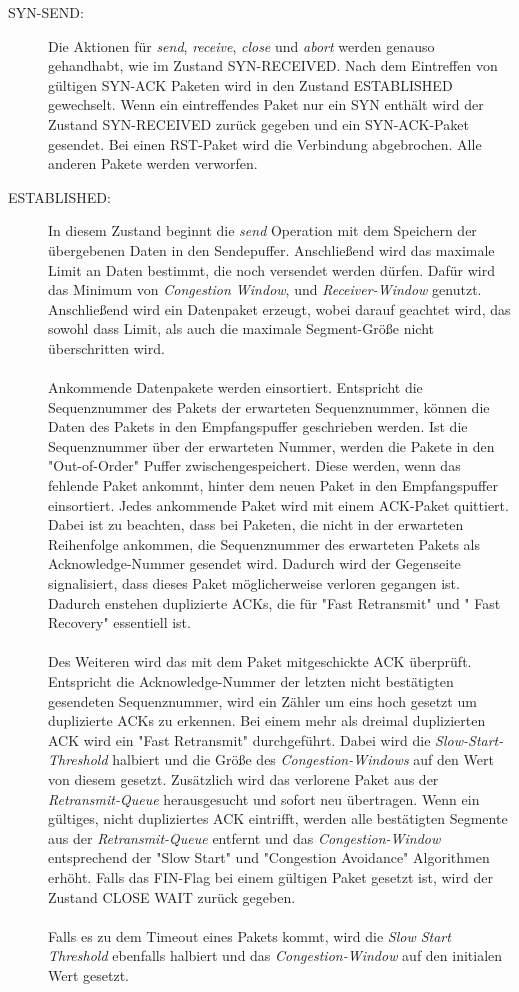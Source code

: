 \begin{description}
	
\item[SYN-SEND:]
Die Aktionen für \textit{send}, \textit{receive},\textit{ close} und \textit{abort} werden genauso gehandhabt, wie im Zustand SYN-RECEIVED.
Nach dem Eintreffen von gültigen SYN-ACK Paketen wird in den Zustand ESTABLISHED gewechselt. Wenn ein eintreffendes Paket nur ein SYN enthält wird der Zustand SYN-RECEIVED zurück gegeben und ein SYN-ACK-Paket gesendet. Bei einen RST-Paket wird die Verbindung abgebrochen. Alle anderen Pakete werden verworfen.   
	
\item[ESTABLISHED:]

In diesem Zustand beginnt die \textit{send} Operation mit dem Speichern der übergebenen Daten in den Sendepuffer. Anschließend wird das maximale Limit an Daten bestimmt, die noch versendet werden dürfen. Dafür wird das Minimum von \textit{Congestion Window}, und \textit{Receiver-Window} genutzt. Anschließend wird ein Datenpaket erzeugt, wobei darauf geachtet wird, das sowohl dass Limit, als auch die maximale Segment-Größe nicht überschritten wird. \\\\
Ankommende Datenpakete werden einsortiert. Entspricht die Sequenznummer des Pakets der erwarteten Sequenznummer, können die Daten des Pakets in den Empfangspuffer geschrieben werden. Ist die Sequenznummer über der erwarteten Nummer, werden die Pakete in den "{}Out-of-Order"{} Puffer zwischengespeichert. Diese werden, wenn das fehlende Paket ankommt, hinter dem neuen Paket in den Empfangspuffer einsortiert. Jedes ankommende Paket wird mit einem ACK-Paket quittiert. Dabei ist zu beachten, dass bei Paketen, die nicht in der erwarteten Reihenfolge ankommen, die Sequenznummer des erwarteten Pakets als Acknowledge-Nummer gesendet wird. Dadurch wird der Gegenseite signalisiert, dass dieses Paket möglicherweise verloren gegangen ist. Dadurch enstehen duplizierte ACKs,  die für  "{}Fast Retransmit"{} und "{} Fast Recovery"{} essentiell ist.\\\\
Des Weiteren wird das mit dem Paket mitgeschickte ACK überprüft. Entspricht die Acknowledge-Nummer der letzten nicht bestätigten gesendeten Sequenznummer, wird ein Zähler um eins hoch gesetzt um duplizierte ACKs zu erkennen. Bei einem mehr als dreimal duplizierten ACK wird ein {}"Fast Retransmit"{} durchgeführt. Dabei wird die \textit{Slow-Start-Threshold} halbiert und die Größe des \textit{Congestion-Windows} auf den Wert von diesem gesetzt. Zusätzlich wird das verlorene Paket aus der \textit{Retransmit-Queue} herausgesucht und sofort neu übertragen. Wenn ein gültiges, nicht dupliziertes ACK eintrifft, werden alle bestätigten Segmente aus der \textit{Retransmit-Queue} entfernt und das \textit{Congestion-Window} entsprechend der "{}Slow Start"{} und "{}Congestion Avoidance"{} Algorithmen erhöht. Falls das FIN-Flag bei einem gültigen Paket gesetzt ist, wird der Zustand CLOSE WAIT zurück gegeben.  \\\\
Falls es zu dem Timeout eines Pakets kommt, wird die \textit{Slow Start Threshold} ebenfalls halbiert und das \textit{Congestion-Window} auf den initialen Wert gesetzt. 


\end{description}
